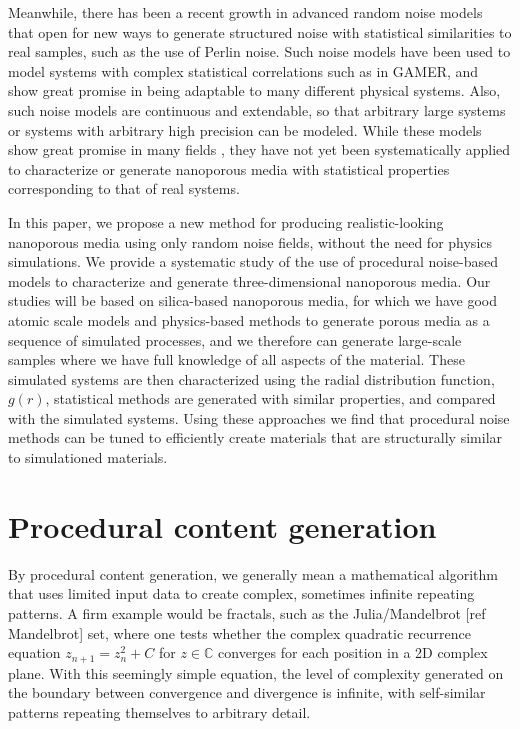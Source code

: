\documentclass[aps,pre,twocolumn,letterpaper,floatfix,showpacs]{revtex4}
\begin{document}
Meanwhile, there has been a recent growth in advanced random noise models that open for new ways to generate structured noise with statistical similarities to real samples, such as the use of Perlin noise. 
Such noise models have been used to model systems with complex statistical correlations such as in GAMER\cite{groeneboom:2014}, and show great promise in being adaptable to many different physical systems. 
Also, such noise models are continuous and extendable, so that arbitrary large systems or systems with arbitrary high precision can be modeled. 
While these models show great promise in many fields \cite{}, they have not yet been systematically applied to characterize or generate nanoporous media with statistical properties corresponding to that of real systems.

In this paper, we propose a new method for producing realistic-looking nanoporous media using only random noise fields, without the need for physics simulations. 
We provide a systematic study of the use of procedural noise-based models to characterize and generate three-dimensional nanoporous media. 
Our studies will be based on silica-based nanoporous media, for which we have good atomic scale models and physics-based methods to generate porous media as a sequence of simulated processes, and we therefore can generate large-scale samples where we have full knowledge of all aspects of the material. 
These simulated systems are then characterized using the radial distribution function, $g(r)$, statistical methods are generated with similar properties, and compared with the simulated systems. 
Using these approaches we find that procedural noise methods can be tuned to efficiently create materials that are structurally similar to simulationed materials. 

\section{Procedural content generation}
By procedural content generation, we generally mean a mathematical algorithm that uses limited input data to create complex, sometimes infinite repeating patterns.
A firm example would be fractals, such as the Julia/Mandelbrot [ref Mandelbrot] set, where one tests whether the complex quadratic recurrence equation $z_{n+1} = z_n^2 +C$ for $z \in \mathbb C$ converges for each position in a 2D complex plane.
With this seemingly simple equation, the level of complexity generated on the boundary between convergence and divergence is infinite, with self-similar patterns repeating themselves to arbitrary detail.
\end{document}
